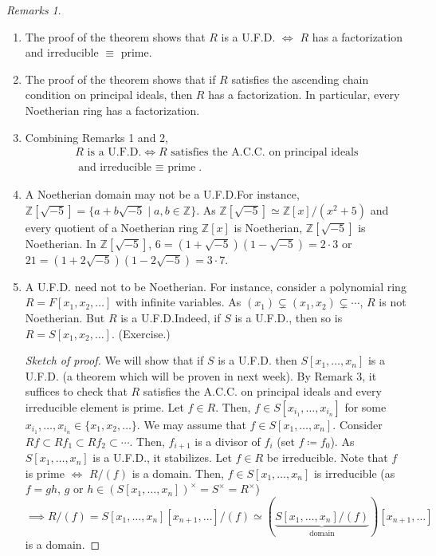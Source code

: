 \documentclass[twoside]{article}
\newcommand\Z{\mathbb Z}
\theoremstyle{remark}
\newtheorem*{remarks}{{Remarks}}
\newcounter{theorem}
\begin{document}
\begin{remarks}
  \begin{enumerate}[label=\arabic*.]
    \item The proof of the theorem shows that \(R\) is a U.F.D. \(\Leftrightarrow\) \(R\) has a factorization and irreducible \(\equiv\) prime.
    \item The proof of the theorem shows that if \(R\) satisfies the ascending chain condition on principal ideals, then \(R\) has a factorization. In particular, every Noetherian ring has a factorization.
    \item Combining Remarks 1 and 2,
    \begin{multline*}
      \text{\(R\) is a U.F.D.} \iff \text{\(R\) satisfies the A.C.C. on principal ideals} \\
      \text{and irreducible \(\equiv\) prime}.
    \end{multline*}
    \item A Noetherian domain may not be a U.F.D.\@ For instance, \(\Z[\sqrt{-5}] = \{a + b\sqrt{-5} \mid a,b \in \Z\}\). As \(\Z[\sqrt{-5}] \simeq \Z[x]/(x^2+5)\) and every quotient of a Noetherian ring \(\Z[x]\) is Noetherian, \(\Z[\sqrt{-5}]\) is Noetherian. In \(\Z[\sqrt{-5}]\), \(6 = (1 + \sqrt{-5})(1 - \sqrt{-5}) = 2 \cdot 3\) or \(21 = (1 + 2 \sqrt{-5})(1 - 2 \sqrt{-5}) = 3 \cdot 7\).
    \item A U.F.D. need not to be Noetherian. For instance, consider a polynomial ring \(R = F[x_1, x_2, \dots]\) with infinite variables. As \((x_1) \subsetneq (x_1,x_2) \subsetneq \cdots\), \(R\) is not Noetherian. But \(R\) is a U.F.D.\@ Indeed, if \(S\) is a U.F.D., then so is \(R = S[x_1, x_2, \dots]\). (Exercise.)
    \begin{proof}[Sketch of proof]
      We will show that if \(S\) is a U.F.D. then \(S[x_1, \dots, x_n]\) is a U.F.D. (a theorem which will be proven in next week). By Remark 3, it suffices to check that \(R\) satisfies the A.C.C. on principal ideals and every irreducible element is prime. Let \(f \in R\). Then, \(f \in S[x_{i_1}, \dots, x_{i_n}]\) for some \(x_{i_1}, \dots, x_{i_n} \in \{x_1, x_2, \dots\}\). We may assume that \(f \in S[x_1, \dots, x_n]\). Consider \(Rf \subset Rf_1 \subset Rf_2 \subset \cdots\). Then, \(f_{i+1}\) is a divisor of \(f_i\) (set \(f \coloneq f_0\)). As \(S[x_1, \dots, x_n]\) is a U.F.D., it stabilizes. Let \(f \in R\) be irreducible. Note that \(f\) is prime \(\Leftrightarrow\) \(R/(f)\) is a domain. Then, \(f \in S[x_1, \dots, x_n]\) is irreducible (as \(f = gh\), \(g\) or \(h \in (S[x_1, \dots, x_n])^\times = S^\times = R^\times\))
      \[ \implies R/(f) = S[x_1, \dots, x_n] [x_{n+1}, \dots] / (f) \simeq (\underbrace{S[x_1, \dots, x_n]/(f)}_{\text{domain}}) [x_{n+1}, \dots] \]
      is a domain.
    \end{proof}
  \end{enumerate}
\end{remarks}
\end{document}
